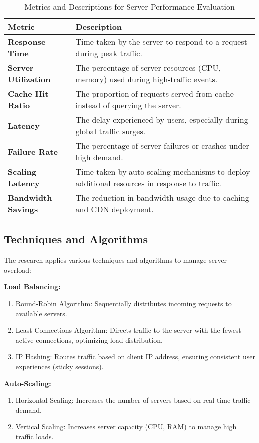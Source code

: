 \documentclass[a4paper, 12pt]{article}
\begin{document}
\begin{table}[h!]
\centering
\caption{Metrics and Descriptions for Server Performance Evaluation}
\begin{tabular}{ll}
\toprule
\textbf{Metric}            & \textbf{Description} \\
\midrule
\textbf{Response Time}      & Time taken by the server to respond to a request during peak traffic. \\
\textbf{Server Utilization} & The percentage of server resources (CPU, memory) used during high-traffic events. \\
\textbf{Cache Hit Ratio}    & The proportion of requests served from cache instead of querying the server. \\
\textbf{Latency}            & The delay experienced by users, especially during global traffic surges. \\
\textbf{Failure Rate}       & The percentage of server failures or crashes under high demand. \\
\textbf{Scaling Latency}    & Time taken by auto-scaling mechanisms to deploy additional resources in response to traffic. \\
\textbf{Bandwidth Savings}  & The reduction in bandwidth usage due to caching and CDN deployment. \\
\bottomrule
\end{tabular}
\end{table}

\subsection{Techniques and Algorithms}

The research applies various techniques and algorithms to manage server overload:

\textbf{Load Balancing:}

\begin{enumerate}
    \item Round-Robin Algorithm: Sequentially distributes incoming requests to available servers.
    \item Least Connections Algorithm: Directs traffic to the server with the fewest active connections, optimizing load distribution.
    \item IP Hashing: Routes traffic based on client IP address, ensuring consistent user experiences (sticky sessions).
\end{enumerate}

\textbf{Auto-Scaling:}
\begin{enumerate}
    \item Horizontal Scaling: Increases the number of servers based on real-time traffic demand.
    \item Vertical Scaling: Increases server capacity (CPU, RAM) to manage high traffic loads.
    
\end{enumerate}
\end{document}
